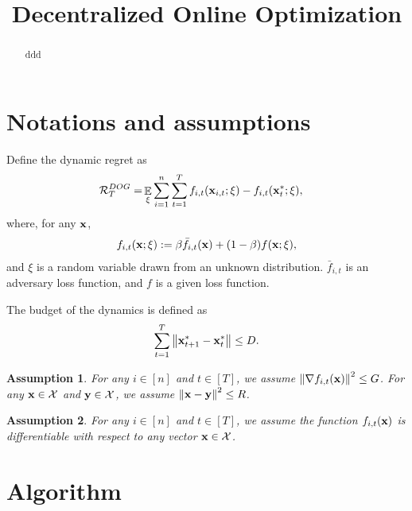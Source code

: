 \documentclass{article}
\title{Decentralized Online Optimization}
\newtheorem{Assumption}{\bf{Assumption}}
\begin{document}
\maketitle

\begin{abstract}
ddd
\end{abstract}

\section{Notations and assumptions}





Define the dynamic regret as
\begin{align}
\nonumber
{\mathcal{R}}_T^{DOG} = & \mathop{\mathbb{E}}_{\xi}\sum_{i=1}^n\sum_{t=1}^T f_{i,t}({\bf x}_{i,t};\xi) - f_{i,t}({\bf x}_t^\ast;\xi),
\end{align} where, for any ${\bf x}$,
\begin{align}
\nonumber
f_{i,t}({\bf x};\xi) := \beta \bar{f}_{i,t}({\bf x}) + (1-\beta) f({\bf x}; \xi),
\end{align} and $\xi$ is a random variable drawn from an unknown distribution. $\bar{f}_{i,t}$ is an adversary loss function, and $f$ is a given loss function.



The budget of the dynamics is defined as
\begin{align}
\nonumber
\sum_{t=1}^T \left\lVert{\bf x}_{t+1}^\ast - {\bf x}_t^\ast\right\rVert \le D.
\end{align}



\begin{Assumption}
\label{assumption_bounded_gradient_domain}
For any $i\in[n]$ and $t\in[T]$, we assume $\left\lVert\nabla f_{i,t}({\bf x})\right\rVert^2 \le G$. For any ${\bf x}\in{\mathcal{X}}$ and ${\bf y}\in{\mathcal{X}}$, we assume $\left\lVert{\bf x}-{\bf y}\right\rVert^2 \le R$.
\end{Assumption}

\begin{Assumption}
\label{assumption_differentiable}
For any $i\in[n]$ and $t\in[T]$, we assume the function $f_{i,t}({\bf x})$ is differentiable with respect to any vector ${\bf x}\in{\mathcal{X}}$.
\end{Assumption}




\section{Algorithm}
\end{document}
